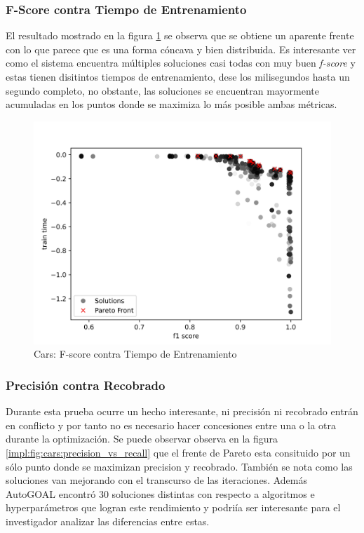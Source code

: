 \subsubsection{F-Score contra Tiempo de Entrenamiento}
El resultado mostrado en la figura \ref{impl:fig:cars:fscore_vs_time} se observa que se obtiene un aparente frente con lo que parece que es una forma c\'oncava y  bien distribuida. Es interesante ver como el sistema encuentra m\'ultiples soluciones   casi todas con muy buen \textit{f-score} y estas tienen disitintos tiempos de entrenamiento, dese los milisegundos hasta un segundo completo, no obstante, las soluciones se encuentran mayormente acumuladas en los puntos donde se maximiza lo m\'as posible ambas m\'etricas.

\begin{figure}[ht]
    \centering
    \includegraphics[scale=0.65]{Pictures/cars_fscore_vs_time.jpg}
    \caption{Cars: F-score contra Tiempo de Entrenamiento}
    \label{impl:fig:cars:fscore_vs_time}
\end{figure}


\subsubsection{Precisi\'on contra Recobrado}
Durante esta prueba ocurre un hecho interesante, ni precisi\'on ni recobrado entr\'an en conflicto y por tanto no es necesario hacer concesiones entre una o la otra durante la optimizaci\'on. Se puede observar observa en la figura \ref{impl:fig:cars:precision_vs_recall} que el frente de Pareto esta consituido por un s\'olo punto donde se maximizan precision y recobrado. Tambi\'en se nota como las soluciones van mejorando con el transcurso de las iteraciones.
Adem\'as AutoGOAL encontr\'o 30 soluciones distintas con respecto a algoritmos e hyperpar\'ametros que logran este rendimiento y podri\'ia ser interesante para el investigador analizar las diferencias entre estas.

